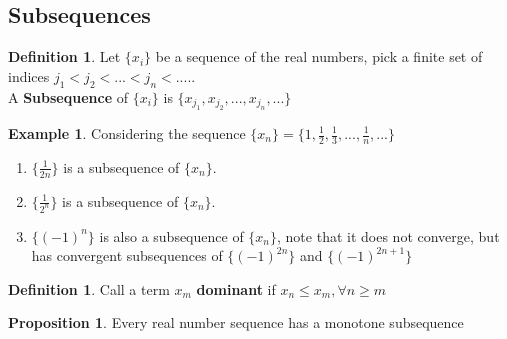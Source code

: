\documentclass[12pt]{article}
\theoremstyle{plain}
\theoremstyle{definition}
\newtheorem{definition}[theorem]{Definition}
\newtheorem{example}[theorem]{Example}
\newtheorem{proposition}[theorem]{Proposition}
\begin{document}
\subsection{Subsequences}

\begin{definition}
    Let $\{ x_i \}$ be a sequence of the real numbers, pick a finite set of indices $j_1 < j_2 < ... < j_n < ....$.\\
    A \textbf{Subsequence} of $\{ x_i \}$ is $\{ x_{j_1}, x_{j_2}, ..., x_{j_n},... \}$
\end{definition}

\begin{example}
    Considering the sequence $\{ x_n \} = \{ 1,\frac{1}{2}, \frac{1}{3}, ..., \frac{1}{n}, ... \}$
    
    \begin{enumerate}
        \item $\{ \frac{1}{2n} \}$ is a subsequence of $\{ x_n \}$.
        \item $\{ \frac{1}{2^n} \}$ is a subsequence of $\{ x_n \}$.
        \item $\{ (-1)^n \}$ is also a subsequence of $\{ x_n \}$, note that it does not converge, but has convergent subsequences of $\{ (-1)^{2n} \}$ and $\{ (-1)^{2n+1} \}$
    \end{enumerate}
\end{example}

\begin{definition}
    Call a term $x_m$ \textbf{dominant} if $x_n \leq x_m, \forall n \geq m$
\end{definition}

\begin{proposition}
    Every real number sequence has a monotone subsequence
\end{proposition}
\end{document}
